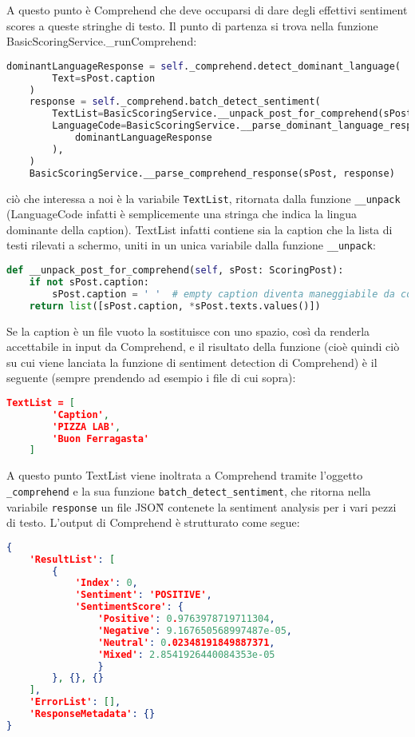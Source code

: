 A questo punto è Comprehend che deve occuparsi di dare degli effettivi sentiment
scores a queste stringhe di testo.
Il punto di partenza si trova nella funzione BasicScoringService.\_runComprehend:
\begin{lstlisting}[language=Python]
    dominantLanguageResponse = self._comprehend.detect_dominant_language(
        Text=sPost.caption
    )
    response = self._comprehend.batch_detect_sentiment(
        TextList=BasicScoringService.__unpack_post_for_comprehend(sPost),
        LanguageCode=BasicScoringService.__parse_dominant_language_response(
            dominantLanguageResponse
        ),
    )
    BasicScoringService.__parse_comprehend_response(sPost, response)
\end{lstlisting}
ciò che interessa a noi è la variabile \verb+TextList+, ritornata dalla funzione \verb+__unpack+ 
(LanguageCode infatti è semplicemente una stringa che indica la lingua dominante della caption).
TextList infatti contiene sia la caption che la lista di testi rilevati a schermo, uniti in un
unica variabile dalla funzione \verb+__unpack+:
\begin{lstlisting}[language=Python]
def __unpack_post_for_comprehend(self, sPost: ScoringPost):
    if not sPost.caption:
        sPost.caption = ' '  # empty caption diventa maneggiabile da comprehend
    return list([sPost.caption, *sPost.texts.values()])
\end{lstlisting}
Se la caption è un file vuoto la sostituisce con uno spazio, così da renderla accettabile in input
da Comprehend, e il risultato della funzione (cioè quindi ciò su cui viene lanciata la funzione di
sentiment detection di Comprehend) è il seguente (sempre prendendo ad esempio i file di cui sopra):
\begin{lstlisting}[language=JSON]
    TextList = [
        'Caption',
        'PIZZA LAB',
        'Buon Ferragasta'
    ]
\end{lstlisting}
A questo punto TextList viene inoltrata a Comprehend tramite l'oggetto \verb+_comprehend+ e la sua
funzione \verb+batch_detect_sentiment+, che ritorna nella variabile \verb+response+ un file JSON\G{}
contenete la sentiment analysis per i vari pezzi di testo. 
L'output di Comprehend è strutturato come segue:
\begin{lstlisting}[language=JSON]
{
    'ResultList': [
        {
            'Index': 0, 
            'Sentiment': 'POSITIVE', 
            'SentimentScore': {
                'Positive': 0.9763978719711304, 
                'Negative': 9.167650568997487e-05, 
                'Neutral': 0.02348191849887371, 
                'Mixed': 2.8541926440084353e-05
                }
        }, {}, {}
    ], 
    'ErrorList': [], 
    'ResponseMetadata': {}
}
\end{lstlisting}
